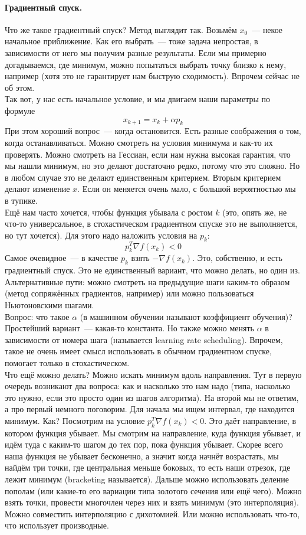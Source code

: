 \documentclass{article}
\begin{document}
    \paragraph{Градиентный спуск.}
    Что же такое градиентный спуск? Метод выглядит так. Возьмём $x_0$~--- некое начальное приближение. Как его выбрать~--- тоже задача непростая, в зависимости от него мы получим разные результаты. Если мы примерно догадываемся, где минимум, можно попытаться выбрать точку близко к нему, например (хотя это не гарантирует нам быструю сходимость). Впрочем сейчас не об этом.\\
    Так вот, у нас есть начальное условие, и мы двигаем наши параметры по формуле
    $$
    x_{k+1}=x_k+\alpha p_k
    $$
    При этом хороший вопрос~--- когда остановится. Есть разные соображения о том, когда останавливаться. Можно смотреть на условия минимума и как-то их проверять. Можно смотреть на Гессиан, если нам нужна высокая гарантия, что мы нашли минимум, но это делают достаточно редко, потому что это сложно. Но в любом случае это не делают единственным критерием. Вторым критерием делают изменение $x$. Если он меняется очень мало, с большой вероятностью мы в тупике.\\
    Ещё нам часто хочется, чтобы функция убывала с ростом $k$ (это, опять же, не что-то универсальное, в стохастическом градиентном спуске это не выполняется, но тут хочется). Для этого надо наложить условия на $p_k$:
    $$
    p_k^T\nabla f(x_k)<0
    $$
    Самое очевидное~--- в качестве $p_k$ взять $-\nabla f(x_k)$. Это, собственно, и есть градиентный спуск. Это не единственный вариант, что можно делать, но один из. Альтернативные пути: можно смотреть на предыдущие шаги каким-то образом (метод сопряжённых градиентов, например) или можно пользоваться Ньютоновскими шагами.\\
    Вопрос: что такое $\alpha$ (в машинном обучении называют коэффициент обучения)? Простейший вариант~--- какая-то константа. Но также можно менять $\alpha$ в зависимости от номера шага (называется learning rate scheduling). Впрочем, такое не очень имеет смысл использовать в обычном градиентном спуске, помогает только в стохастическом.\\
    Что ещё можно делать? Можно искать минимум вдоль направления. Тут в первую очередь возникают два вопроса: как и насколько это нам надо (типа, насколько это нужно, если это просто один из шагов алгоритма). На второй мы не ответим, а про первый немного поговорим. Для начала мы ищем интервал, где находится минимум. Как? Посмотрим на условие $p_k^T\nabla f(x_k)<0$. Это даёт направление, в котором функция убывает. Мы смотрим на направление, куда функция убывает, и идём туда с каким-то шагом до тех пор, пока функция убывает.  Скорее всего наша функция не убывает бесконечно, а значит когда начнёт возрастать, мы найдём три точки, где центральная меньше боковых, то есть наши отрезок, где лежит минимум (bracketing называется). Дальше можно использовать деление пополам (или какие-то его вариации типа золотого сечения или ещё чего). Можно взять точки, провести многочлен через них и взять минимум (это интерполяция). Можно совместить интерполяцию с дихотомией. Или можно использовать что-то, что использует производные.
\end{document}
